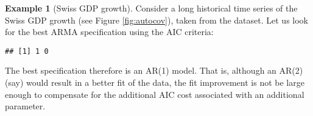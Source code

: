\documentclass[
  12pt,
]{book}
\newenvironment{Shaded}{\begin{snugshade}}{\end{snugshade}}
\newcommand{\AttributeTok}[1]{\textcolor[rgb]{0.77,0.63,0.00}{#1}}
\newcommand{\CommentTok}[1]{\textcolor[rgb]{0.56,0.35,0.01}{\textit{#1}}}
\newcommand{\ConstantTok}[1]{\textcolor[rgb]{0.00,0.00,0.00}{#1}}
\newcommand{\ControlFlowTok}[1]{\textcolor[rgb]{0.13,0.29,0.53}{\textbf{#1}}}
\newcommand{\DecValTok}[1]{\textcolor[rgb]{0.00,0.00,0.81}{#1}}
\newcommand{\FunctionTok}[1]{\textcolor[rgb]{0.00,0.00,0.00}{#1}}
\newcommand{\NormalTok}[1]{#1}
\newcommand{\OtherTok}[1]{\textcolor[rgb]{0.56,0.35,0.01}{#1}}
\newcommand{\SpecialCharTok}[1]{\textcolor[rgb]{0.00,0.00,0.00}{#1}}
\newcommand{\StringTok}[1]{\textcolor[rgb]{0.31,0.60,0.02}{#1}}
\theoremstyle{definition}
\theoremstyle{definition}
\newtheorem{example}{Example}[chapter]
\theoremstyle{definition}
\theoremstyle{definition}
\theoremstyle{remark}
\begin{document}
\begin{example}[Swiss GDP growth]
\protect\hypertarget{exm:SwissGrowthAIC}{}\label{exm:SwissGrowthAIC}Consider a long historical time series of the Swiss GDP growth (see Figure \ref{fig:autocov}), taken from the \citet{JST_2017} dataset. Let us look for the best ARMA specification using the AIC criteria:

\begin{Shaded}
\end{Shaded}

\begin{verbatim}
## [1] 1 0
\end{verbatim}

The best specification therefore is an AR(1) model. That is, although an AR(2) (say) would result in a better fit of the data, the fit improvement is not be large enough to compensate for the additional AIC cost associated with an additional parameter.
\end{example}
\end{document}
